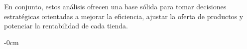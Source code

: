 \documentclass[,article,submit,moreauthors,pdftex]{Definitions/mdpi}
\begin{document}
En conjunto, estos análisis ofrecen una base sólida para tomar
decisiones estratégicas orientadas a mejorar la eficiencia, ajustar la
oferta de productos y potenciar la rentabilidad de cada tienda.


\vspace{6pt}













\begin{adjustwidth}{-\extralength}{0cm}




%

\PublishersNote{}
\end{adjustwidth}
\end{document}
